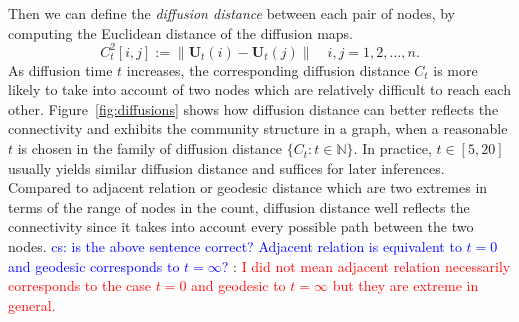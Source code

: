 \documentclass[11pt]{article}
\theoremstyle{definition}
\newcommand{\cs}[1]{\textcolor{blue}{cs: #1}}
\begin{document}
Then we can define the \textit{diffusion distance} between each pair of nodes, by computing the Euclidean distance of the diffusion maps. 
\begin{equation}
\label{eq:diffusion}
C^2_{t}[i,j]  :=   \parallel \mathbf{U}_{t}(i) - \mathbf{U}_{t}(j) \parallel   \quad i,j = 1,2, \ldots , n.
\end{equation}
As diffusion time $t$ increases, the corresponding diffusion distance $C_{t}$ is more likely to take into account of two nodes which are relatively difficult to reach each other. Figure~\ref{fig:diffusions} shows how diffusion distance can better reflects the connectivity and exhibits the community structure in a graph, when a reasonable $t$ is chosen in the family of diffusion distance $\{ C_{t} : t \in \mathbb{N} \}$. In practice, $t \in [5,20]$ usually yields similar diffusion distance and suffices for later inferences. Compared to adjacent relation or geodesic distance which are two extremes in terms of the range of nodes in the count, diffusion distance well reflects the connectivity since it takes into account every possible path between the two nodes. 
\cs{is the above sentence correct? Adjacent relation is equivalent to $t=0$ and geodesic corresponds to $t=\infty$?} : \textcolor{red}{I did not mean adjacent relation necessarily corresponds to the case $t=0$ and geodesic to $t = \infty$ but they are extreme in general.}
\end{document}
